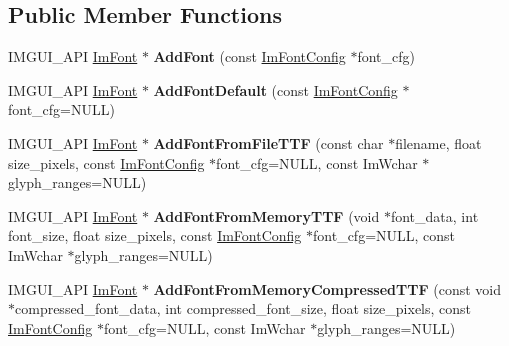 \subsection*{Public Member Functions}
\begin{DoxyCompactItemize}
\item 
\mbox{\label{structImFontAtlas_ad01c0f19a95d37a9e5ebab1e54525625}} 
I\+M\+G\+U\+I\+\_\+\+A\+PI \hyperlink{structImFont}{Im\+Font} $\ast$ {\bfseries Add\+Font} (const \hyperlink{structImFontConfig}{Im\+Font\+Config} $\ast$font\+\_\+cfg)
\item 
\mbox{\label{structImFontAtlas_a9d2b4a94579bf603a0d2662cd8348cbd}} 
I\+M\+G\+U\+I\+\_\+\+A\+PI \hyperlink{structImFont}{Im\+Font} $\ast$ {\bfseries Add\+Font\+Default} (const \hyperlink{structImFontConfig}{Im\+Font\+Config} $\ast$font\+\_\+cfg=N\+U\+LL)
\item 
\mbox{\label{structImFontAtlas_a26d0333bae95222ca2c2fd2886eae562}} 
I\+M\+G\+U\+I\+\_\+\+A\+PI \hyperlink{structImFont}{Im\+Font} $\ast$ {\bfseries Add\+Font\+From\+File\+T\+TF} (const char $\ast$filename, float size\+\_\+pixels, const \hyperlink{structImFontConfig}{Im\+Font\+Config} $\ast$font\+\_\+cfg=N\+U\+LL, const Im\+Wchar $\ast$glyph\+\_\+ranges=N\+U\+LL)
\item 
\mbox{\label{structImFontAtlas_adb01397920998a18e25bd8fed3f791a7}} 
I\+M\+G\+U\+I\+\_\+\+A\+PI \hyperlink{structImFont}{Im\+Font} $\ast$ {\bfseries Add\+Font\+From\+Memory\+T\+TF} (void $\ast$font\+\_\+data, int font\+\_\+size, float size\+\_\+pixels, const \hyperlink{structImFontConfig}{Im\+Font\+Config} $\ast$font\+\_\+cfg=N\+U\+LL, const Im\+Wchar $\ast$glyph\+\_\+ranges=N\+U\+LL)
\item 
\mbox{\label{structImFontAtlas_a579bb434bd116ea9ac4f892652ccefdb}} 
I\+M\+G\+U\+I\+\_\+\+A\+PI \hyperlink{structImFont}{Im\+Font} $\ast$ {\bfseries Add\+Font\+From\+Memory\+Compressed\+T\+TF} (const void $\ast$compressed\+\_\+font\+\_\+data, int compressed\+\_\+font\+\_\+size, float size\+\_\+pixels, const \hyperlink{structImFontConfig}{Im\+Font\+Config} $\ast$font\+\_\+cfg=N\+U\+LL, const Im\+Wchar $\ast$glyph\+\_\+ranges=N\+U\+LL)
\item 
\mbox{\label{structImFontAtlas_ab43b930beb57c0b998f42f4586677956}} 

\end{DoxyCompactItemize}
